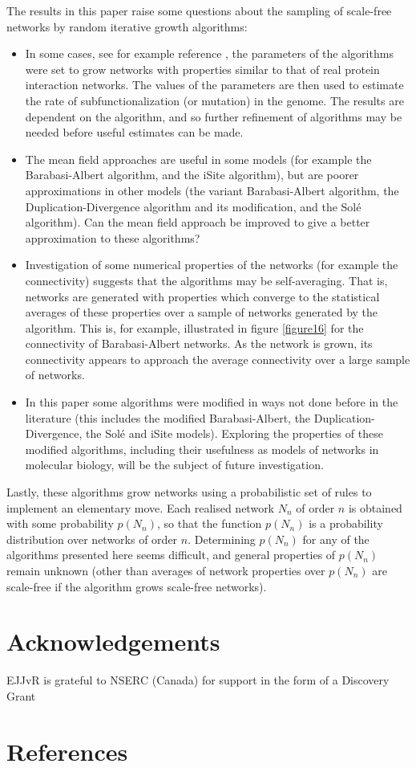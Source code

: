 \documentclass[12pt]{iopart}
\begin{document}
The results in this paper raise some questions about the sampling of scale-free networks by random iterative growth algorithms: 
\begin{itemize} 
\item In some cases, see for example reference \cite{VF02}, the parameters of the algorithms 
were set to grow networks with properties similar to that of real protein 
interaction networks. The values of the parameters are then used to estimate 
the rate of subfunctionalization (or mutation) in the genome. The results are dependent on 
the algorithm, and so further refinement of algorithms may be needed before useful estimates 
can be made. 
\item The mean field approaches are useful in some models (for example the 
Barabasi-Albert algorithm, and the iSite algorithm), but are poorer approximations in 
other models (the variant Barabasi-Albert algorithm, the Duplication-Divergence 
algorithm and its modification, and the Sol\'e algorithm). Can the mean field approach 
be improved to give a better approximation to these algorithms? 
\item Investigation of some numerical properties of the networks (for example the connectivity) 
suggests that the algorithms may be self-averaging. That is, networks are generated 
with properties which converge to the statistical averages of these properties 
over a sample of networks generated by the algorithm.  This is, for example, illustrated
in figure \ref{figure16} for the connectivity of Barabasi-Albert networks.  As the network is
grown, its connectivity appears to approach the average connectivity over a large sample
of networks. 
\item In this paper some algorithms were modified in ways not done before in 
the literature (this includes the modified Barabasi-Albert, the Duplication-Divergence, 
the Sol\'e and iSite models).  Exploring the properties of these modified algorithms,
including their usefulness as models of networks in molecular biology, will be the
subject of future investigation.
\end{itemize} 

Lastly, these algorithms grow networks using a probabilistic set of rules to
implement an elementary move.  Each realised network $N_n$ of order $n$ 
is obtained with some probability $p(N_n)$, so that the function $p(N_n)$ is 
a probability distribution over networks of order $n$.  Determining $p(N_n)$ for
any of the algorithms presented here seems difficult, and general properties
of $p(N_n)$ remain unknown (other than averages of network properties
over $p(N_n)$ are scale-free if the algorithm grows scale-free networks).




\section*{Acknowledgements}
  EJJvR is grateful to NSERC (Canada) for support in the form of a Discovery Grant

\section*{References}

\vfill\eject
\end{document}

